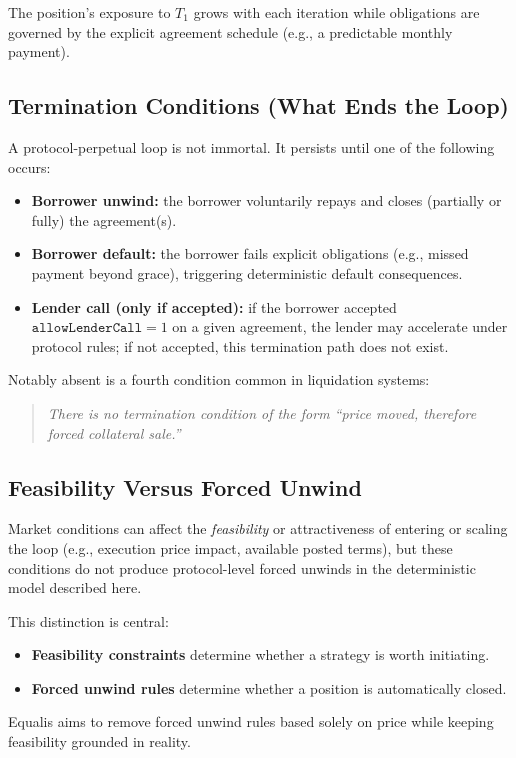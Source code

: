 \documentclass[version=preprint]{iacrcc}
\begin{document}
The position’s exposure to $T_1$ grows with each iteration while obligations are governed by the explicit agreement schedule (e.g., a predictable monthly payment).

\subsection{Termination Conditions (What Ends the Loop)}

A protocol-perpetual loop is not immortal. It persists until one of the following occurs:
\begin{itemize}
  \item \textbf{Borrower unwind:} the borrower voluntarily repays and closes (partially or fully) the agreement(s).
  \item \textbf{Borrower default:} the borrower fails explicit obligations (e.g., missed payment beyond grace), triggering deterministic default consequences.
  \item \textbf{Lender call (only if accepted):} if the borrower accepted $\texttt{allowLenderCall}=1$ on a given agreement, the lender may accelerate under protocol rules; if not accepted, this termination path does not exist.
\end{itemize}

Notably absent is a fourth condition common in liquidation systems:
\begin{quote}
\textit{There is no termination condition of the form ``price moved, therefore forced collateral sale.''}
\end{quote}

\subsection{Feasibility Versus Forced Unwind}

Market conditions can affect the \textit{feasibility} or attractiveness of entering or scaling the loop (e.g., execution price impact, available posted terms), but these conditions do not produce protocol-level forced unwinds in the deterministic model described here.

This distinction is central:
\begin{itemize}
  \item \textbf{Feasibility constraints} determine whether a strategy is worth initiating.
  \item \textbf{Forced unwind rules} determine whether a position is automatically closed.
\end{itemize}
Equalis aims to remove forced unwind rules based solely on price while keeping feasibility grounded in reality.
\end{document}
